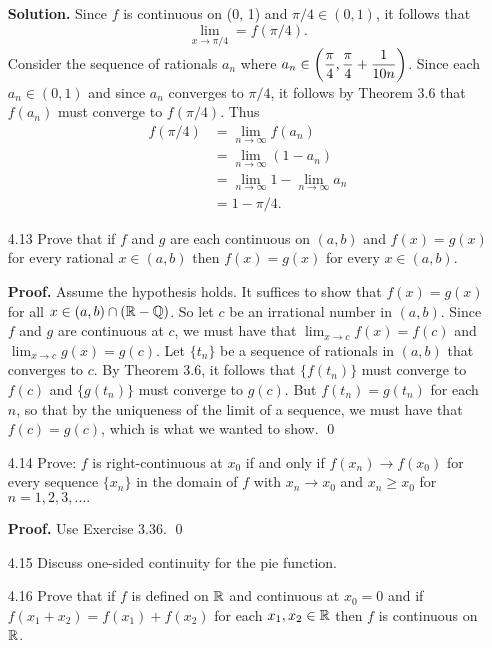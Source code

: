 \begin{enumerate}
      \textbf{Solution.} Since $f$ is continuous on (0, 1) and
      $\pi/4 \in (0, 1)$, it follows that
      $$\lim_{x \rightarrow \pi/4} = f(\pi/4).$$
      Consider the sequence of rationals $a_n$ where
      $\displaystyle a_n \in \left(\frac{\pi}{4}, \frac{\pi}{4} + \frac{1}{10n}\right)$.
      Since each $a_n \in (0, 1)$ and since $a_n$ converges to $\pi/4$, it 
      follows by Theorem 3.6 that $f(a_n)$ must converge to $f(\pi/4)$. Thus
      \begin{align*}
         f(\pi/4) &= \lim_{n\rightarrow\infty}f(a_n) \\
            &= \lim_{n\rightarrow\infty}(1 - a_n) \\
            &= \lim_{n\rightarrow\infty}1 - \lim_{n\rightarrow\infty}a_n \\
            &= 1 - \pi/4.
      \end{align*}
   \item[4.13] Prove that if $f$ and $g$ are each continuous on $(a, b)$ and
               $f(x) = g(x)$ for every rational $x \in (a, b)$ then
               $f(x) = g(x)$ for every $x \in (a, b)$.

      \textbf{Proof.} Assume the hypothesis holds. It suffices to show that
      $f(x) = g(x)$ for all $x \in (a, b) \cap (\mathbb{R} - \mathbb{Q})$. So let $c$ be an
      irrational number in $(a, b)$. Since $f$ and $g$ are continuous at $c$, we 
      must have that $\lim_{x\rightarrow c}f(x) = f(c)$ and
      $\lim_{x\rightarrow c}g(x) = g(c)$. Let $\{t_n\}$ be a sequence of 
      rationals in $(a, b)$ that converges to $c$. By Theorem 3.6, it follows 
      that $\{f(t_n)\}$ must converge to $f(c)$ and $\{g(t_n)\}$ must converge 
      to $g(c)$. But $f(t_n) = g(t_n)$ for each $n$, so that by the uniqueness 
      of the limit of a sequence, we must have that $f(c) = g(c)$, which is what 
      we wanted to show. \qed
   \item[4.14] Prove: $f$ is right-continuous at $x_0$ if and only if
               $f(x_n) \rightarrow f(x_0)$ for every sequence $\{x_n\}$ in the
               domain of $f$ with $x_n \rightarrow x_0$ and $x_n \ge x_0$ for
               $n = 1, 2, 3, ....$

      \textbf{Proof.} Use Exercise 3.36. \qed
   \item[4.15] Discuss one-sided continuity for the pie function.
   \item[4.16] Prove that if $f$ is defined on $\mathbb{R}$ and continuous at $x_0 = 0$
               and if $f(x_1 + x_2) = f(x_1) + f(x_2)$ for each
               $x_1, x_2 \in \mathbb{R}$ then $f$ is continuous on $\mathbb{R}$.
               

\end{enumerate}
